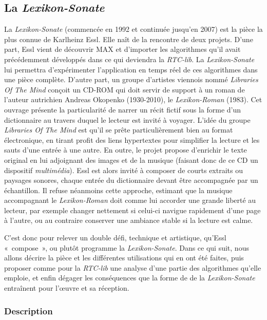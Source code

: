 \documentclass[a4paper,12pt]{article}
\newcommand{\guill}[1]{«~#1~»}
\begin{document}
\subsection{La \emph{Lexikon-Sonate}}
\label{lalexikonsonate}

La \emph{Lexikon-Sonate} (commencée en 1992 et continuée jusqu'en 2007) est la pièce la plus connue de Karlheinz Essl. Elle naît de la rencontre de deux projets. D'une part, Essl vient de découvrir MAX et d'importer les algorithmes qu'il avait précédemment développés dans ce qui deviendra la \emph{RTC-lib}. La \emph{Lexikon-Sonate} lui permettra d'expérimenter l'application en temps réel de ces algorithmes dans une pièce complète. D'autre part, un groupe d'artistes viennois nommé \emph{Libraries Of The Mind} conçoit un CD-ROM qui doit servir de support à un roman de l'auteur autrichien Andreas Okopenko (1930-2010), le \emph{Lexikon-Roman} (1983). Cet ouvrage présente la particularité de narrer un récit fictif sous la forme d'un dictionnaire au travers duquel le lecteur est invité à voyager. L'idée du groupe \emph{Libraries Of The Mind} est qu'il se prête particulièrement bien au format électronique, en tirant profit des liens hypertextes pour simplifier la lecture et les sauts d'une entrée à une autre. En outre, le projet propose d'enrichir le texte original en lui adjoignant des images et de la musique (faisant donc de ce CD un dispositif \emph{multimédia}). Essl est alors invité à composer de courts extraits ou paysages sonores, chaque entrée du dictionnaire devant être accompagnée par un échantillon. Il refuse néanmoins cette approche, estimant que la musique accompagnant le \emph{Lexikon-Roman} doit comme lui accorder une grande liberté au lecteur, par exemple changer nettement si celui-ci navigue rapidement d'une page à l'autre, ou au contraire conserver une ambiance stable si la lecture est calme.

C'est donc pour relever un double défi, technique et artistique, qu'Essl \guill{compose}, ou plutôt programme la \emph{Lexikon-Sonate}. Dans ce qui suit, nous allons décrire la pièce et les différentes utilisations qui en ont été faites, puis proposer comme pour la \emph{RTC-lib} une analyse d'une partie des algorithmes qu'elle emploie, et enfin dégager les conséquences que la forme de de la \emph{Lexikon-Sonate} entraînent pour l'œuvre et sa réception.

\subsubsection{Description}
\end{document}
